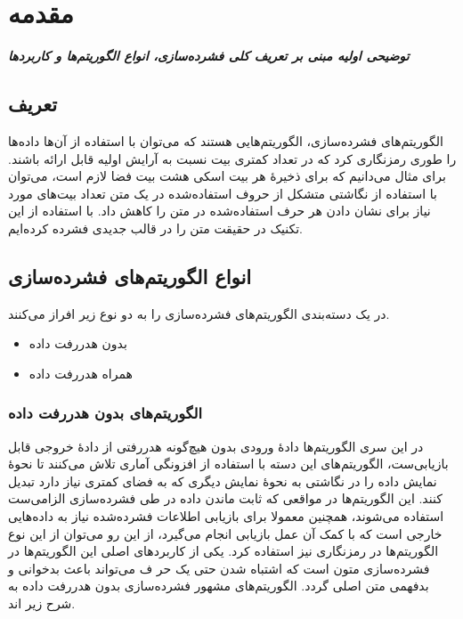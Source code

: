 \chapter{مقدمه}
\noindent
\textbf{
	\textit{
		توضیحی اولیه مبنی بر تعریف کلی فشرده‌سازی، انواع الگوریتم‌ها و کاربردها
	}
}
\pagebreak
\section{تعریف}

الگوریتم‌های فشرده‌سازی، الگوریتم‌هایی هستند که می‌توان با استفاده از آن‌ها داده‌ها را طوری رمزنگاری کرد که در تعداد 	کمتری بیت نسبت به آرایش اولیه
قابل ارائه باشند.
\cite{data_compression}
برای مثال می‌دانیم که برای ذخیرهٔ هر بیت اسکی
 هشت بیت فضا لازم است، می‌توان با استفاده از نگاشتی متشکل از حروف استفاده‌شده در 
یک متن تعداد بیت‌های مورد نیاز برای نشان دادن هر حرف استفاده‌شده در متن را کاهش داد.
با استفاده از این تکنیک در حقیقت متن را در قالب جدیدی فشرده کرده‌ایم.

\section{انواع الگوریتم‌های فشرده‌سازی}

در یک دسته‌بندی الگوریتم‌های فشرده‌سازی را به دو نوع زیر افراز می‌کنند.
\begin{itemize}
	\item  بدون هدررفت داده 
	\item  همراه هدررفت داده 
\end{itemize}

\subsection{الگوریتم‌های بدون هدررفت داده}
در این سری الگوریتم‌ها دادهٔ ورودی بدون هیچ‌گونه هدررفتی از دادهٔ خروجی قابل بازیابی‌ست، الگوریتم‌های 
این دسته با استفاده از افزونگی آماری تلاش می‌کنند تا نحوهٔ نمایش داده را در نگاشتی به نحوهٔ نمایش دیگری که به فضای کمتری نیاز دارد 
تبدیل کنند.
این الگوریتم‌ها در مواقعی که 
ثابت ماندن داده در طی فشرده‌سازی الزامی‌ست استفاده می‌شوند، همچنین معمولا برای بازیابی اطلاعات فشرده‌شده نیاز به 
داده‌هایی خارجی است که با کمک آن عمل بازیابی انجام می‌گیرد، از این رو می‌توان از این نوع الگوریتم‌ها در رمزنگاری نیز 
استفاده کرد. یکی از کاربردهای اصلی این الگوریتم‌ها در فشرده‌سازی متون است که اشتباه شدن حتی یک حر	ف می‌تواند باعث بدخوانی و 
بدفهمی متن اصلی گردد. الگوریتم‌های مشهور فشرده‌سازی بدون هدررفت داده به شرح زیر اند\cite{data_types}.


